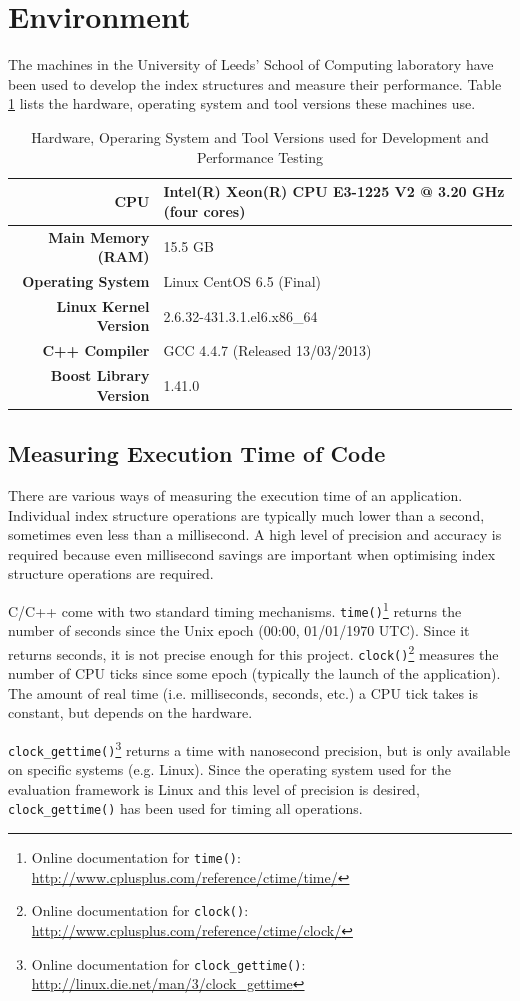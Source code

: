 \section{Environment}

The machines in the University of Leeds' School of Computing laboratory have been used to develop the index structures and measure their performance. Table \ref{tab:system-specifications} lists the hardware, operating system and tool versions these machines use.

\begin{table}
	\centering
	\begin{tabular}{|r|l|}
		\hline
		\textbf{CPU} & Intel(R) Xeon(R) CPU E3-1225 V2 @ 3.20 GHz (four cores) \\
		\hline
		\textbf{Main Memory (RAM)} & 15.5 GB \\
		\hline
		\textbf{Operating System} & Linux CentOS 6.5 (Final) \\
		\hline
		\textbf{Linux Kernel Version} & 2.6.32-431.3.1.el6.x86\_64 \\
		\hline
		\textbf{C++ Compiler} & GCC 4.4.7 (Released 13/03/2013) \\
		\hline
		\textbf{Boost Library Version} & 1.41.0 \\
		\hline
	\end{tabular}
	\caption{Hardware, Operaring System and Tool Versions used for Development and Performance Testing}
	\label{tab:system-specifications}
\end{table}

\subsection{Measuring Execution Time of Code}

There are various ways of measuring the execution time of an application. Individual index structure operations are typically much lower than a second, sometimes even less than a millisecond. A high level of precision and accuracy is required because even millisecond savings are important when optimising index structure operations are required.

C/C++ come with two standard timing mechanisms. \texttt{time()}\footnote{Online documentation for \texttt{time()}: \url{http://www.cplusplus.com/reference/ctime/time/}} returns the number of seconds since the Unix epoch (00:00, 01/01/1970 UTC). Since it returns seconds, it is not precise enough for this project. \texttt{clock()}\footnote{Online documentation for \texttt{clock()}: \url{http://www.cplusplus.com/reference/ctime/clock/}}  measures the number of CPU ticks since some epoch (typically the launch of the application). The amount of real time (i.e. milliseconds, seconds, etc.) a CPU tick takes is constant, but depends on the hardware.

\texttt{clock\_gettime()}\footnote{Online documentation for \texttt{clock\_gettime()}: \url{http://linux.die.net/man/3/clock_gettime}} returns a time with nanosecond precision, but is only available on specific systems (e.g. Linux). Since the operating system used for the evaluation framework is Linux and this level of precision is desired, \texttt{clock\_gettime()} has been used for timing all operations.